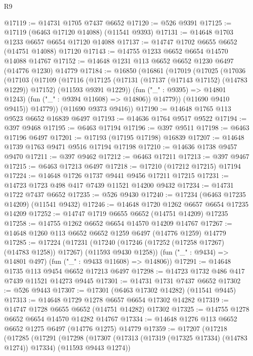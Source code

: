 \begin{lexlean}{R9}
\begin{coremodule}
{{{{{{{{{{{{{{{{{{{{{{{{{{{{{{{{{{{{{{{{{{{{{{{{{{{{{{{{{{{{{{{{{{{{{{{{{{{{{{{{{{{{@17119 := @14731 @1705 @7437 @6652
@17120 := @526 @9391
@17125 := @17119 (@6463 @17120 @14088) (@11541 @9393)
@17131 := @14648 @1703 @1233 @6657 @6654 @17120 @14088
@17137 := @14747 @1702 @6655 @6652 (@14751 @14088) @17120
@17143 := @14755 @1233 @6652 @6654 @14570 @14088 @14767
@17152 := @14648 @1231 @113 @6652 @6652 @1230 @6497 (@14776 @1230) @14779
@17184 := @16850
    (@16861
      (@17019
        (@17025
          (@17036
            (@17103
              (@17109
                (@17116
                  (@17125
                    (@17131 (@17137 (@17143 @17152) (@14783 @1229)) @17152)
                    (@11593 @9391 @1229))
                  (fun ("_" : @9395) => @14801 @1243)
                  (fun ("_" : @9394 @11608) => @14806))
                @14779))
            (@11690 @9410 @9415))
          @14779))
      (@11690 @9373 @9416))
@17190 := @14648 @1765 @113 @9523 @6652 @16839 @6497
@17193 := @14636 @1764 @9517 @9522
@17194 := @397 @9468
@17195 := @6463 @17194
@17196 := @397 @9511
@17198 := @6463 @17196 @6497
@17201 := @17193 (@17195 @17198) @16839
@17207 := @14648 @1739 @1763 @9471 @9516 @17194 @17198
@17210 := @14636 @1738 @9457 @9470
@17211 := @397 @9462
@17212 := @6463 @17211
@17213 := @397 @9467
@17215 := @6463 @17213 @6497
@17218 := @17210 (@17212 @17215) @17194
@17224 := @14648 @1726 @1737 @9441 @9456 @17211 @17215
@17231 := @14723 @1723 @498 @417 @7439 @11521 @14200 @9432
@17234 := @14731 @1722 @7437 @6652
@17235 := @526 @9430
@17240 := @17234 (@6463 @17235 @14209) (@11541 @9432)
@17246 := @14648 @1720 @1262 @6657 @6654 @17235 @14209
@17252 := @14747 @1719 @6655 @6652 (@14751 @14209) @17235
@17258 := @14755 @1262 @6652 @6654 @14570 @14209 @14767
@17267 := @14648 @1260 @113 @6652 @6652 @1259 @6497 (@14776 @1259) @14779
@17285 := @17224
    (@17231
      (@17240 (@17246 (@17252 (@17258 @17267) (@14783 @1258)) @17267) (@11593 @9430 @1258))
      (fun ("_" : @9434) => @14801 @497)
      (fun ("_" : @9433 @11608) => @14806))
@17291 := @14648 @1735 @113 @9454 @6652 @17213 @6497
@17298 := @14723 @1732 @486 @417 @7439 @11521 @14273 @9445
@17301 := @14731 @1731 @7437 @6652
@17302 := @526 @9443
@17307 := @17301 (@6463 @17302 @14282) (@11541 @9445)
@17313 := @14648 @1729 @1278 @6657 @6654 @17302 @14282
@17319 := @14747 @1728 @6655 @6652 (@14751 @14282) @17302
@17325 := @14755 @1278 @6652 @6654 @14570 @14282 @14767
@17334 := @14648 @1276 @113 @6652 @6652 @1275 @6497 (@14776 @1275) @14779
@17359 := @17207
    (@17218
      (@17285
        (@17291
          (@17298
            (@17307 (@17313 (@17319 (@17325 @17334) (@14783 @1274)) @17334) (@11593 @9443 @1274))
}}}}}}}}}}}}}}}}}}}}}}}}}}}}}}}}}}}}}}}}}}}}}}}}}}}}}}}}}}}}}}}}}}}}}}}}}}}}}}}}}}}}
\end{coremodule}
\end{lexlean}
